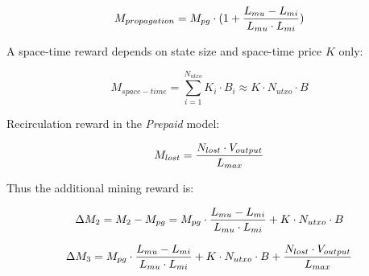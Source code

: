 \documentclass[]{llncs}   %
\newcommand{\authnote}[2]{\marginpar{\parbox{\marginparwidth}{\tiny %
  \textsf{#1 {\textcolor{blue}{notes: #2}}}}}%
  \textcolor{blue}{\textbf{\dag}}}
\newcommand{\authnote}[2]{
  \textsf{#1 \textcolor{blue}{: #2}}}
\newcommand{\authnote}[2]{}
\newcommand{\dnote}[1]{{\authnote{\textcolor{blue}{Dima notes}}{#1}}}
\newcommand{\esse}{\textit{SSE}}
\newcommand{\ignore}[1]{} %
\begin{document}
\begin{equation}
M_{propagation} = M_{pg} \cdot(1 + {{L_{mu}-L_{mi}} \over {L_{mu} \cdot L_{mi}}})
\end{equation}



\ignore{
  In Section \ref{sec:flow} we have noticed, that \esse{} users have an incentive to actively use their coins and propagation reward is correlated with space-time reward:

  \begin{equation}
    M_{propagation} = r_{flow} \cdot M_{space-time} + M_{pg}
  \end{equation}

  where $C$ is non-negative constant. 
}

A space-time reward depends on state size and space-time price $K$ only:

\begin{equation}
M_{space-time} = \sum_{i=1}^{N_{utxo}} K_i \cdot B_i \approx K \cdot N_{utxo} \cdot B
\end{equation}

Recirculation reward in the \textit{Prepaid} model:


\begin{equation}
M_{lost} = {N_{lost} \cdot V_{output} \over L_{max}}
\end{equation}

Thus the additional mining reward is:

\begin{equation}
\Delta M_2 = M_2 - M_{pg} = M_{pg} \cdot {{L_{mu}-L_{mi}} \over {L_{mu} \cdot L_{mi}}} + K \cdot N_{utxo} \cdot B
\end{equation}

\begin{equation}
\Delta M_3 = M_{pg} \cdot {{L_{mu}-L_{mi}} \over {L_{mu} \cdot L_{mi}}} + K \cdot N_{utxo} \cdot B + {N_{lost} \cdot V_{output} \over L_{max}}
\end{equation}
\end{document}
